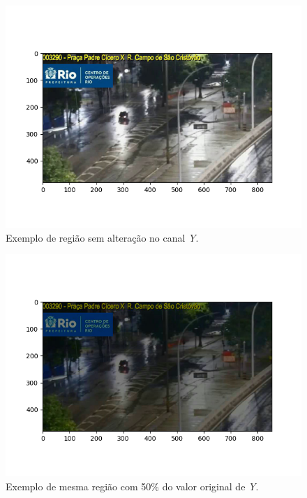 \begin{figure}[htb]
    \centerline{\includegraphics[width=1\linewidth]{images/metodologia/samplebright.png}}
    \caption{Exemplo de região sem alteração no canal \textit{Y}.}
    \label{fig:samplebright}
\end{figure}
\begin{figure}[htb]
    \centerline{\includegraphics[width=1\linewidth]{images/metodologia/samplebright_half.png}}
    \caption{Exemplo de mesma região com 50\% do valor original de \textit{Y}.}
    \label{fig:samplebright_half}
\end{figure}


